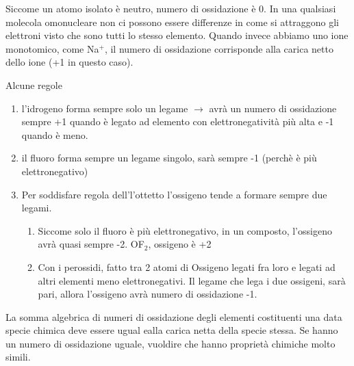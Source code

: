 \documentclass[a4paper]{article}
\begin{document}
Siccome un atomo isolato è neutro, numero di ossidazione è 0. In una qualsiasi molecola omonucleare non ci possono essere differenze in come si attraggono gli elettroni visto che sono tutti lo stesso elemento. Quando invece abbiamo uno ione monotomico, come Na$^+$, il numero di ossidazione corrisponde alla carica netto dello ione (+1 in questo caso).

Alcune regole 
\begin{enumerate}
    \item l'idrogeno forma sempre solo un legame $\rightarrow$ avrà un numero di ossidazione sempre +1 quando è legato ad elemento con elettronegatività più alta e -1 quando è meno. 
    \item il fluoro forma sempre un legame singolo, sarà sempre -1 (perchè è più elettronegativo)
    \item Per soddisfare regola dell'l'ottetto l'ossigeno tende a formare sempre due legami. \begin{enumerate}
        \item Siccome solo il fluoro è più elettronegativo, in un composto, l'ossigeno avrà quasi sempre -2. OF$_2$, ossigeno è +2
        \item Con i perossidi, fatto tra 2 atomi di Ossigeno legati fra loro e legati ad altri elementi meno elettronegativi. Il legame che lega i due ossigeni, sarà pari, allora l'ossigeno avrà numero di ossidazione -1. 
    \end{enumerate}
\end{enumerate}

La somma algebrica di numeri di ossidazione degli elementi costituenti una data specie chimica deve essere ugual ealla carica netta della specie stessa. Se hanno un numero di ossidazione uguale, vuoldire che hanno proprietà chimiche molto simili. 
\end{document}
